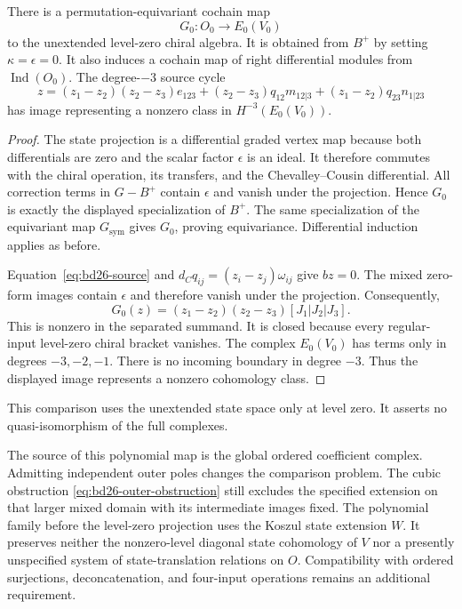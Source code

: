 \begin{corollary}\label{cor:bd26-native-zero}
There is a permutation-equivariant cochain map
\[
 G_0:O_0\longrightarrow E_0(V_0)
\]
to the unextended level-zero chiral algebra.
It is obtained from $B^+$ by setting $\kappa=\epsilon=0$.
It also induces a cochain map of right differential modules from $\operatorname{Ind}(O_0)$.
The degree-$-3$ source cycle
\begin{equation}\label{eq:bd26-nonzero-cycle}
 z=(z_1-z_2)(z_2-z_3)e_{123}
   +(z_2-z_3)q_{12}m_{12|3}
   +(z_1-z_2)q_{23}n_{1|23}
\end{equation}
has image representing a nonzero class in $H^{-3}(E_0(V_0))$.
\end{corollary}
\begin{proof}
The state projection is a differential graded vertex map because both differentials are zero and the scalar factor $\epsilon$ is an ideal.
It therefore commutes with the chiral operation, its transfers, and the Chevalley--Cousin differential.
All correction terms in $G-B^+$ contain $\epsilon$ and vanish under the projection.
Hence $G_0$ is exactly the displayed specialization of $B^+$.
The same specialization of the equivariant map $G_{\mathrm{sym}}$ gives $G_0$, proving equivariance.
Differential induction applies as before.

Equation~\eqref{eq:bd26-source} and $d_Cq_{ij}=(z_i-z_j)\omega_{ij}$ give $bz=0$.
The mixed zero-form images contain $\epsilon$ and therefore vanish under the projection.
Consequently,
\[
 G_0(z)=(z_1-z_2)(z_2-z_3)[J_1|J_2|J_3].
\]
This is nonzero in the separated summand.
It is closed because every regular-input level-zero chiral bracket vanishes.
The complex $E_0(V_0)$ has terms only in degrees $-3,-2,-1$.
There is no incoming boundary in degree $-3$.
Thus the displayed image represents a nonzero cohomology class.
\end{proof}

This comparison uses the unextended state space only at level zero.
It asserts no quasi-isomorphism of the full complexes.

The source of this polynomial map is the global ordered coefficient complex.
Admitting independent outer poles changes the comparison problem.
The cubic obstruction \eqref{eq:bd26-outer-obstruction} still excludes the specified extension on that larger mixed domain with its intermediate images fixed.
The polynomial family before the level-zero projection uses the Koszul state extension $W$.
It preserves neither the nonzero-level diagonal state cohomology of $V$ nor a presently unspecified system of state-translation relations on $O$.
Compatibility with ordered surjections, deconcatenation, and four-input operations remains an additional requirement.

